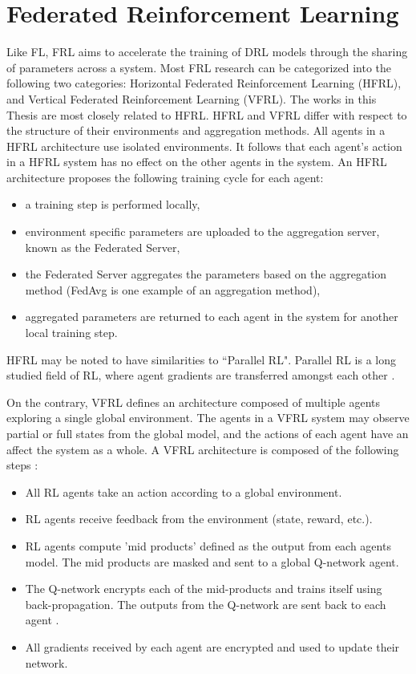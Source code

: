 \section{Federated Reinforcement Learning}
Like FL, FRL aims to accelerate the training of DRL models through the sharing of parameters
across a system. Most FRL research can be categorized into the following two categories:
Horizontal Federated Reinforcement Learning (HFRL), and Vertical Federated Reinforcement
Learning (VFRL).  The works in this Thesis are most closely related to HFRL.  HFRL and VFRL
differ with respect to the structure of their environments and aggregation methods.  All
agents in a HFRL architecture use isolated environments. It follows that each agent's action
in a HFRL system has no effect on the other agents in the system.  An HFRL architecture
proposes the following training cycle for each agent:

\begin{itemize}
    \item a training step is performed locally,
    \item environment specific parameters are uploaded to the aggregation server,
    known as the Federated Server,
    \item the Federated Server aggregates the parameters based on the aggregation
    method (FedAvg is one example of an aggregation method),
    \item aggregated parameters are returned to each agent in the system for
    another local training step.
\end{itemize}

HFRL may be noted to have similarities to ``Parallel RL".  Parallel RL is a long studied
field of RL, where agent gradients are transferred amongst each other
\cite{Lim2020, Nadiger2019}.

On the contrary, VFRL defines an architecture composed
of multiple agents exploring a single global environment. The agents in a VFRL system
may observe partial or full states from the global model, and the actions of each agent
have an affect the system as a whole. A VFRL architecture is composed of the following steps \cite{IntelAI19}:

\begin{itemize}
    \item All RL agents take an action according to a global environment.
    \item RL agents receive feedback from the environment (state, reward, etc.).
    \item RL agents compute 'mid products' defined as the output from each agents model.
    The mid products are masked and sent to a global Q-network agent.
    \item The Q-network encrypts each of the mid-products and trains itself using back-propagation.
    The outputs from the Q-network are sent back to each agent \cite{IntelAI19}.
    \item All gradients received by each agent are encrypted and used to update their network.
\end{itemize}

